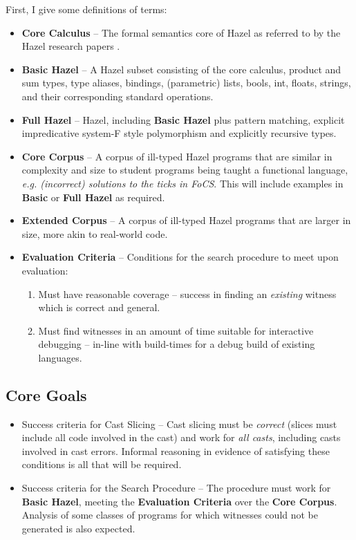 First, I give some definitions of terms:
\begin{itemize}
\item \textbf{Core Calculus} -- The formal semantics core of Hazel as referred to by the Hazel research papers \cite{HazelLivePaper}.
\item \textbf{Basic Hazel} -- A Hazel subset consisting of the core calculus, product and sum types, type aliases, bindings, (parametric) lists, bools, int, floats, strings, and their corresponding standard operations.
\item \textbf{Full Hazel} -- Hazel, including \textbf{Basic Hazel} plus pattern matching, explicit impredicative system-F style polymorphism and explicitly recursive types.
\item \textbf{Core Corpus} -- A corpus of ill-typed Hazel programs that are similar in complexity and size to student programs being taught a functional language, \textit{e.g. (incorrect) solutions to the ticks in FoCS}. This will include examples in \textbf{Basic} or \textbf{Full Hazel} as required.
\item \textbf{Extended Corpus} -- A corpus of ill-typed Hazel programs that are larger in size, more akin to real-world code.
\item \textbf{Evaluation Criteria} -- Conditions for the search procedure to meet upon evaluation:
\begin{enumerate}
\item Must have reasonable coverage --  success in finding an \textit{existing} witness which is correct and general.
\item Must find witnesses in an amount of time suitable for interactive debugging -- in-line with build-times for a debug build of existing languages.
\end{enumerate}
\end{itemize}
\subsection{Core Goals}
\begin{itemize}
\item Success criteria for Cast Slicing -- Cast slicing must be \textit{correct} (slices must include all code involved in the cast) and work for \textit{all casts}, including casts involved in cast errors. Informal reasoning in evidence of satisfying these conditions is all that will be required. 
\item Success criteria for the Search Procedure -- The procedure must work for \textbf{Basic Hazel}, meeting the \textbf{Evaluation Criteria} over the \textbf{Core Corpus}. Analysis of some classes of programs for which witnesses could not be generated is also expected.
\end{itemize}

